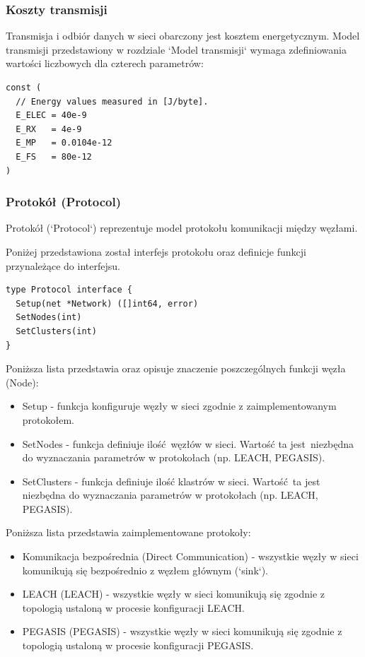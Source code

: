 \documentclass[a4paper,12pt,twoside,openany]{report}
\begin{document}
\subsubsection{Koszty transmisji}

Transmisja i odbiór danych w sieci obarczony jest kosztem energetycznym.
Model transmisji przedstawiony w rozdziale `Model transmisji` wymaga zdefiniowania wartości liczbowych dla czterech parametrów:

\begin{lstlisting}
const (
  // Energy values measured in [J/byte].
  E_ELEC = 40e-9
  E_RX   = 4e-9
  E_MP   = 0.0104e-12
  E_FS   = 80e-12
)
\end{lstlisting}

\subsubsection{Protokół (Protocol)}

Protokół (`Protocol`) reprezentuje model protokołu komunikacji między węzłami.

Poniżej przedstawiona został interfejs protokołu oraz definicje funkcji przynależące do interfejsu.

\begin{lstlisting}
type Protocol interface {
  Setup(net *Network) ([]int64, error)
  SetNodes(int)
  SetClusters(int)
}
\end{lstlisting}

Poniższa lista przedstawia oraz opisuje znaczenie poszczególnych funkcji węzła (Node):

\begin{itemize}
 \item Setup - funkcja konfiguruje węzły w sieci zgodnie z zaimplementowanym protokołem.
 \item SetNodes - funkcja definiuje ilość węzłów w sieci. Wartość ta jest niezbędna do wyznaczania parametrów w protokołach (np. LEACH, PEGASIS).
 \item SetClusters - funkcja definiuje ilość klastrów w sieci. Wartość ta jest niezbędna do wyznaczania parametrów w protokołach (np. LEACH, PEGASIS).
\end{itemize}

Poniższa lista przedstawia zaimplementowane protokoły:

\begin{itemize}
 \item Komunikacja bezpośrednia	(Direct Communication) - wszystkie węzły w sieci komunikują się bezpośrednio z węzłem głównym (`sink`).
 \item LEACH (LEACH) - wszystkie węzły w sieci komunikują się zgodnie z topologią ustaloną w procesie konfiguracji LEACH.
 \item PEGASIS (PEGASIS) - wszystkie węzły w sieci komunikują się zgodnie z topologią ustaloną w procesie konfiguracji PEGASIS.
\end{itemize}
\end{document}
